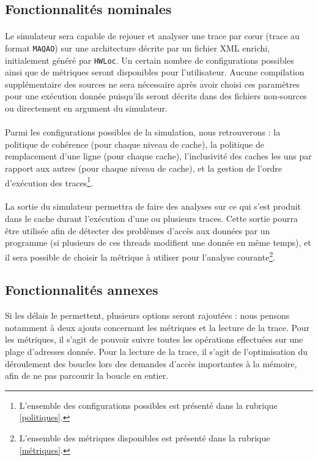 \subsection{Fonctionnalités nominales}

\paragraph{}
Le simulateur sera capable de rejouer et analyser une trace par c\oe ur (trace au format \texttt{MAQAO}) sur une architecture décrite par un fichier XML enrichi, initialement généré par \texttt{HWLoc}. Un certain nombre de configurations possibles ainsi que de métriques seront disponibles pour l'utilisateur. Aucune compilation supplémentaire des sources ne sera nécessaire après avoir choisi ces paramètres pour une exécution donnée puisqu'ils seront décrits dans des fichiers non-sources ou directement en argument du simulateur. 

\paragraph{}
Parmi les configurations possibles de la simulation, nous retrouverons : la politique de cohérence (pour chaque niveau de cache), la politique de remplacement d'une ligne (pour chaque cache), l'inclusivité des caches les uns par rapport aux autres (pour chaque niveau de cache), et la gestion de l'ordre d'exécution des traces\footnote{L'ensemble des configurations possibles est présenté dans la rubrique \ref{politiques}.}.

\paragraph{}
La sortie du simulateur permettra de faire des analyses sur ce qui s'est produit dans le cache durant l'exécution d'une ou plusieurs traces. Cette sortie pourra être utilisée afin de détecter des problèmes d'accès aux données par un programme (si plusieurs de ces threads modifient une donnée en même temps), et il sera possible de choisir la métrique à utiliser pour l'analyse courante\footnote{L'ensemble des métriques disponibles est présenté dans la rubrique \ref{métriques}.}. 

\subsection{Fonctionnalités annexes}

Si les délais le permettent, plusieurs options seront rajoutées : nous pensons notamment à deux ajouts concernant les métriques et la lecture de la trace. Pour les métriques, il s'agit de pouvoir suivre toutes les opérations effectuées sur une plage d'adresses donnée. Pour la lecture de la trace, il s'agit de l'optimisation du déroulement des boucles lors des demandes d'accès importantes à la mémoire, afin de ne pas parcourir la boucle en entier.

